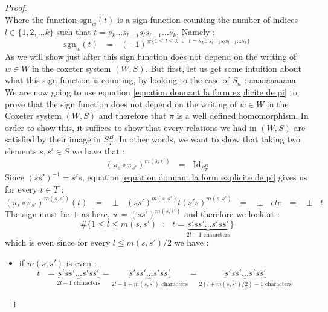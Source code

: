 \documentclass[envcountsame,envcountchap]{svmono}
\newcommand{\qq}{\text{ }}
\begin{document}
\begin{proof}
\begin{equation}
		\end{equation}
		Where the function $\mbox{sgn}_w(t)$ is a sign function counting the number of indices $l\in \{1,2,...k\}$ such that $t=s_k...s_{l-1}s_l s_{l-1}...s_k$. Namely :
		\begin{equation}
		 \mbox{sgn}_w(t)\qq=\qq (-1)^{\# \{1\leq l\leq k\qq :\qq t=s_k...s_{l-1}s_l s_{l-1}...s_k\}}
		\end{equation}
		As we will show just after this sign function does not depend on the writing of $w\in W$ in the coxeter system $(W,S)$. But first, let us get some intuition about what this sign function is counting, by looking to the case of $S_n$ : aaaaaaaaaaa\\
		
		We are now going to use equation \ref{equation donnant la form explicite de pi} to prove that the sign function does not depend on the writing of $w\in W$ in the Coxeter system $(W,S)$ and  therefore that $\pi$ is a well defined homomorphism. In order to show this, it suffices to show that every relations we had in $(W,S)$ are satisfied by their image in $S^B_T$. In other words, we want to show that taking two elements $s,s'\in S$ we have that :
		\begin{equation}\label{equation provant que les relations sont preserves par pi}
		(\pi_s\circ \pi_{s'})^{m(s,s')}\qq=\qq \mbox{Id}_{S^B_T}
		\end{equation}
		Since $(ss')^{-1}=s's$, equation \ref{equation donnant la form explicite de pi} gives us for every $t\in T$ :
		\begin{equation}
		(\pi_s\circ \pi_{s'})^{m(s,s')}(t)\qq=\qq \pm\qq (ss')^{m(s,s')}t(s's)^{m(s,s')}\qq=\qq \pm \qq et e\qq=\qq\pm \qq  t
		\end{equation}
		The sign must be $+$ as here, $w=(ss')^{m(s,s')}$ and therefore we look at :
		\begin{equation}
		{\# \{1\leq l\leq m(s,s') \qq :\qq t=\underset{2l-1 \mbox{ characters}}{\underbrace{s'ss'...s'ss'}}\}}
		\end{equation}
		which is even since for every $l\leq m(s,s')/2$ we have :
		\begin{itemize}
			\item if $ m(s,s')$ is even : 
			\begin{equation}
			t\qq= \underset{2l-1 \mbox{ characters}}{\underbrace{s'ss'...s'ss'}}=\underset{2l-1 + m(s,s') \mbox{ characters}}{\underbrace{s'ss'...s'ss'}}= \underset{2(l+m(s,s')/2)-1 \mbox{ characters}}{\underbrace{s'ss'...s'ss'}} 
			\end{equation}

\end{itemize}
\end{proof}
\end{document}
